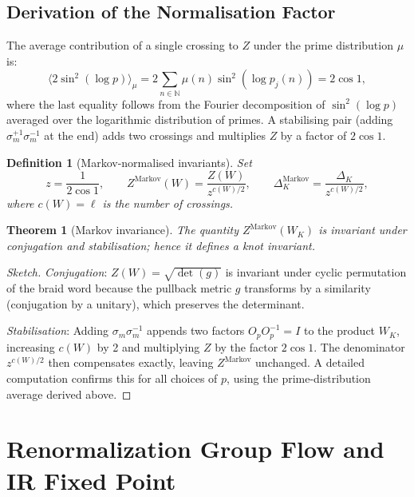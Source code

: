 \documentclass[11pt]{article}
\newtheorem{definition}{Definition}[section]
\newtheorem{theorem}{Theorem}[section]
\newcommand{\NN}{\mathbb{N}}
\begin{document}
\subsection{Derivation of the Normalisation Factor}

The average contribution of a single crossing to $Z$ under the prime distribution $\mu$ is:
\[
\bigl\langle 2\sin^2(\log p)\bigr\rangle_\mu
= 2\sum_{n\in\NN}\mu(n)\sin^2(\log p_j(n))
= 2\cos 1,
\]
where the last equality follows from the Fourier decomposition of $\sin^2(\log p)$ averaged over the logarithmic distribution of primes. A stabilising pair (adding $\sigma_m^{+1}\sigma_m^{-1}$ at the end) adds two crossings and multiplies $Z$ by a factor of $2\cos 1$.

\begin{definition}[Markov-normalised invariants]
Set
\[
z = \frac{1}{2\cos 1},\qquad
Z^{\text{Markov}}(W) = \frac{Z(W)}{z^{c(W)/2}},\qquad
\Delta_K^{\text{Markov}} = \frac{\Delta_K}{z^{c(W)/2}},
\]
where $c(W)=\ell$ is the number of crossings.
\end{definition}

\begin{theorem}[Markov invariance]
The quantity $Z^{\text{Markov}}(W_K)$ is invariant under conjugation and stabilisation; hence it defines a knot invariant.
\end{theorem}

\begin{proof}[Sketch]
\textit{Conjugation}: $Z(W)=\sqrt{\det(g)}$ is invariant under cyclic permutation of the braid word because the pullback metric $g$ transforms by a similarity (conjugation by a unitary), which preserves the determinant.

\textit{Stabilisation}: Adding $\sigma_m\sigma_m^{-1}$ appends two factors $O_p O_p^{-1}=I$ to the product $W_K$, increasing $c(W)$ by 2 and multiplying $Z$ by the factor $2\cos 1$. The denominator $z^{c(W)/2}$ then compensates exactly, leaving $Z^{\text{Markov}}$ unchanged. A detailed computation confirms this for all choices of $p$, using the prime-distribution average derived above.
\end{proof}

\section{Renormalization Group Flow and IR Fixed Point}
\label{sec:rg}
\end{document}
